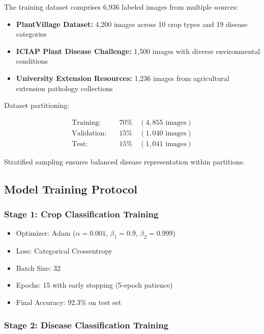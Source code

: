 \documentclass[conference]{IEEEtran}
\begin{document}
The training dataset comprises 6,936 labeled images from multiple sources:

\begin{itemize}
\item \textbf{PlantVillage Dataset:} 4,200 images across 10 crop types and 19 disease categories
\item \textbf{ICIAP Plant Disease Challenge:} 1,500 images with diverse environmental conditions
\item \textbf{University Extension Resources:} 1,236 images from agricultural extension pathology collections
\end{itemize}

Dataset partitioning:

\begin{equation}
\begin{aligned}
\text{Training:} & \quad 70\% \quad (4,855 \text{ images}) \\
\text{Validation:} & \quad 15\% \quad (1,040 \text{ images}) \\
\text{Test:} & \quad 15\% \quad (1,041 \text{ images})
\end{aligned}
\end{equation}

Stratified sampling ensures balanced disease representation within partitions.

\subsection{Model Training Protocol}

\subsubsection{Stage 1: Crop Classification Training}

\begin{itemize}
\item Optimizer: Adam ($\alpha=0.001$, $\beta_1=0.9$, $\beta_2=0.999$)
\item Loss: Categorical Crossentropy
\item Batch Size: 32
\item Epochs: 15 with early stopping (5-epoch patience)
\item Final Accuracy: 92.3\% on test set
\end{itemize}

\subsubsection{Stage 2: Disease Classification Training}
\end{document}
